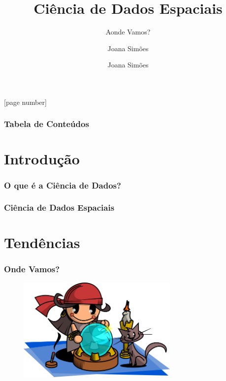 \documentclass[hyperref={pdfpagelabels=true}]{beamer}
\title{Ci\^{e}ncia de Dados Espaciais}
\subtitle{Aonde Vamos?}
\author{Joana Sim\~{o}es}
\author[shortname]{Joana Sim\~{o}es \inst{1}}
\institute[shortinst]{\inst{1} Eurecat, Centro Tecnol\'{o}gico da Catalunha}
\begin{document}
[page number]

\titlepage

 
\begin{frame}
\frametitle{Tabela de Conte\'{u}dos}
\tiny{
\tableofcontents}
\end{frame}


\section{Introdu\c{c}\~{a}o} 
\begin{frame}
\frametitle{O que \'{e} a Ci\^{e}ncia de Dados?}


\end{frame}

\begin{frame}
\frametitle{Ci\^{e}ncia de Dados Espaciais}


\end{frame}

\section{Tend\^{e}ncias} 
\begin{frame}
\frametitle{Onde Vamos?}

    \begin{figure}   
         \includegraphics[width=0.7\textwidth]{fortune-teller.png}   
    \end{figure}     

\end{frame}
\end{document}
